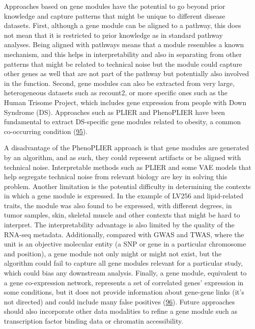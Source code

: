 Approaches based on gene modules have the potential to go beyond prior knowledge and capture patterns that might be unique to different disease datasets.
First, although a gene module can be aligned to a pathway, this does not mean that it is restricted to prior knowledge as in standard pathway analyses.
Being aligned with pathways means that a module resembles a known mechanism, and this helps in interpretability and also in separating from other patterns that might be related to technical noise but the module could capture other genes as well that are not part of the pathway but potentially also involved in the function.
Second, gene modules can also be extracted from very large, heterogeneous datasets such as recount2, or more specific ones such as the Human Trisome Project, which includes gene expression from people with Down Syndrome (DS).
Approaches such as PLIER and PhenoPLIER have been fundamental to extract DS-specific gene modules related to obesity, a common co-occurring condition (\protect\hyperlink{ref-B7FF0NeZ}{95}).

A disadvantage of the PhenoPLIER approach is that gene modules are generated by an algorithm, and as such, they could represent artifacts or be aligned with technical noise.
Interpretable methods such as PLIER and some VAE models that help segregate technical noise from relevant biology are key in solving this problem.
Another limitation is the potential difficulty in determining the contexts in which a gene module is expressed.
In the example of LV256 and lipid-related traits, the module was also found to be expressed, with different degrees, in tumor samples, skin, skeletal muscle and other contexts that might be hard to interpret.
The interpretability advantage is also limited by the quality of the RNA-seq metadata.
Additionally, compared with GWAS and TWAS, where the unit is an objective molecular entity (a SNP or gene in a particular chromosome and position), a gene module not only might or might not exist, but the algorithm could fail to capture all gene modules relevant for a particular study, which could bias any downstream analysis.
Finally, a gene module, equivalent to a gene co-expression network, represents a set of correlated genes' expression in some conditions, but it does not provide information about gene-gene links (it's not directed) and could include many false positives (\protect\hyperlink{ref-jVQ2rMqc}{96}).
Future approaches should also incorporate other data modalities to refine a gene module such as transcription factor binding data or chromatin accessibility.

